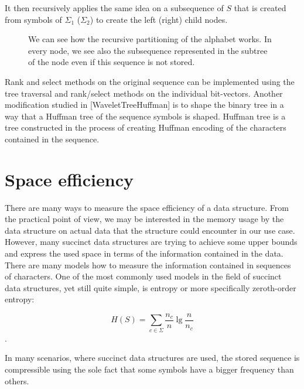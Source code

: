 It then recursively applies the same idea on a subsequence of $S$ that is created
from symbols of $\Sigma_1$ ($\Sigma_2$) to create the left (right) child nodes.

\begin{figure}
	\centerline{
	}
	\caption[TODO]{We can see how the recursive partitioning of the alphabet works. In every node,
	we see also the subsequence represented in the subtree of the node even if this
	sequence is not stored.}
	\label{obr:WaveletTreeExample}
\end{figure}

Rank and select methods on the original sequence can be implemented using the tree
traversal and rank/select methods on the individual bit-vectors. Another modification
studied in [WaveletTreeHuffman] is to shape the binary tree in a way that a Huffman
tree of the sequence symbols is shaped. Huffman tree is a tree constructed in the
process of creating Huffman encoding of the characters contained in the sequence.

\section{Space efficiency}

There are many ways to measure the space efficiency of a data structure. From the
practical point of view, we may be interested in the memory usage by the data
structure on actual data that the structure could encounter in our use case. However,
many succinct data structures are trying to achieve some upper bounds and express
the used space in terms of the information contained in the data. There are many
models how to measure the information contained in sequences of characters. One
of the most commonly used models in the field of succinct data structures, yet still
quite simple, is entropy or more specifically zeroth-order entropy:

$$H(S)=\sum_{c\in\Sigma} \frac{n_c}{n} \lg \frac{n}{n_c}$$.

In many scenarios, where succinct data structures are used, the stored sequence
is compressible using the sole fact that some symbols have a bigger frequency than others.

\cite{raman2007succinct}
